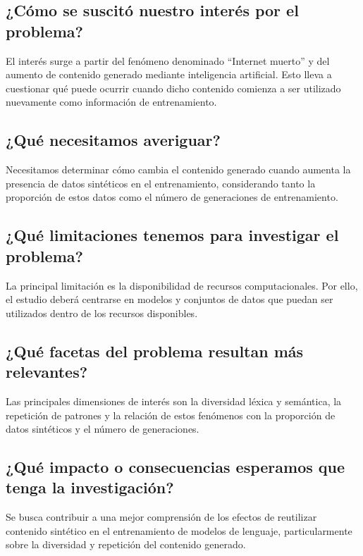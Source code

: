\documentclass[12pt]{article}
\begin{document}
\subsection{¿Cómo se suscitó nuestro interés por el problema?}

El interés surge a partir del fenómeno denominado ``Internet muerto'' y
del aumento de contenido generado mediante inteligencia artificial. Esto
lleva a cuestionar qué puede ocurrir cuando dicho contenido comienza a
ser utilizado nuevamente como información de entrenamiento.

\subsection{¿Qué necesitamos averiguar?}

Necesitamos determinar cómo cambia el contenido generado cuando aumenta
la presencia de datos sintéticos en el entrenamiento, considerando tanto
la proporción de estos datos como el número de generaciones de
entrenamiento.

\subsection{¿Qué limitaciones tenemos para investigar el problema?}

La principal limitación es la disponibilidad de recursos
computacionales. Por ello, el estudio deberá centrarse en modelos y
conjuntos de datos que puedan ser utilizados dentro de los recursos
disponibles.

\subsection{¿Qué facetas del problema resultan más relevantes?}

Las principales dimensiones de interés son la diversidad léxica y
semántica, la repetición de patrones y la relación de estos fenómenos
con la proporción de datos sintéticos y el número de generaciones.

\subsection{¿Qué impacto o consecuencias esperamos que tenga la investigación?}

Se busca contribuir a una mejor comprensión de los efectos de reutilizar
contenido sintético en el entrenamiento de modelos de lenguaje,
particularmente sobre la diversidad y repetición del contenido generado.
\end{document}
